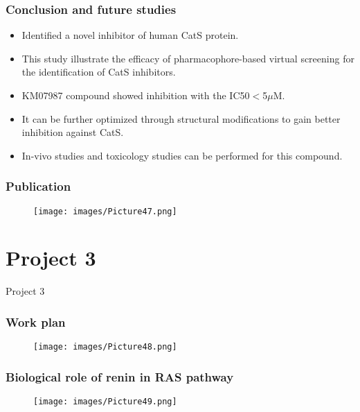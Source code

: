 \documentclass{beamer}
\begin{document}
\begin{frame}
\frametitle{\textbf{Conclusion and future studies}}
\begin{itemize}
\item Identified a novel inhibitor of human CatS protein.
\item This study illustrate the efficacy of pharmacophore-based virtual screening for the identification of CatS inhibitors.
\item KM07987 compound showed inhibition with the IC50$<$5$\mu$M.
\item It can be further optimized through structural modifications to gain better inhibition against CatS.
\item In-vivo studies and toxicology studies can be performed for this compound.
\end{itemize}
\end{frame}

\begin{frame}
\frametitle{\textbf{Publication}}
\begin{figure}
\texttt{[image: images/Picture47.png]}
\end{figure}
\end{frame}


\section{Project 3}

\begin{frame}
\begin{block}
\Huge{\centerline{Project 3}}
\end{block}
\end{frame}

\begin{frame}
\frametitle{\textbf{Work plan}}
\begin{figure}
\texttt{[image: images/Picture48.png]}
\end{figure}
\end{frame}

\begin{frame}
\frametitle{\textbf{Biological role of renin in RAS pathway}}
\begin{figure}
\texttt{[image: images/Picture49.png]}
\end{figure}
\end{frame}
\end{document}

